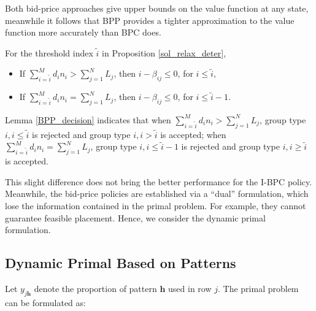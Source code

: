 Both bid-price approaches give upper bounds on the value function at any state, meanwhile it follows that BPP provides a tighter approximation to the value function more accurately than BPC does.    


\begin{lem}\label{BPP_decision}    
    For the threshold index $\tilde{i}$ in Proposition \ref{sol_relax_deter},
    \begin{itemize}
        \item If $\sum_{i=\tilde{i}}^{M} d_{i} n_{i} > \sum_{j=1}^{N} L_{j}$, then $i - \beta_{ij} \leq 0$, for $i \leq \tilde{i}$,
        \item If $\sum_{i=\tilde{i}}^{M} d_{i} n_{i} = \sum_{j=1}^{N} L_{j}$, then $i - \beta_{ij} \leq 0$, for $i \leq \tilde{i}-1$.
    \end{itemize}
\end{lem}

Lemma \ref{BPP_decision} indicates that when $\sum_{i=\tilde{i}}^{M} d_{i} n_{i} > \sum_{j=1}^{N} L_{j}$, group type $i, i \leq \tilde{i}$ is rejected and group type $i, i > \tilde{i}$ is accepted; when $\sum_{i=\tilde{i}}^{M} d_{i} n_{i} = \sum_{j=1}^{N} L_{j}$, group type $i, i \leq \tilde{i}-1$ is rejected and group type $i, i \geq \tilde{i}$ is accepted.




This slight difference does not bring the better performance for the I-BPC policy. Meanwhile, the bid-price policies are established via a ``dual'' formulation, which lose the information contained in the primal problem. For example, they cannot guarantee feasible placement. Hence, we consider the dynamic primal formulation.

\subsection{Dynamic Primal Based on Patterns}

Let $y_{j \bm{h}}$ denote the proportion of pattern $\bm{h}$ used in row $j$. The primal problem can be formulated as:

